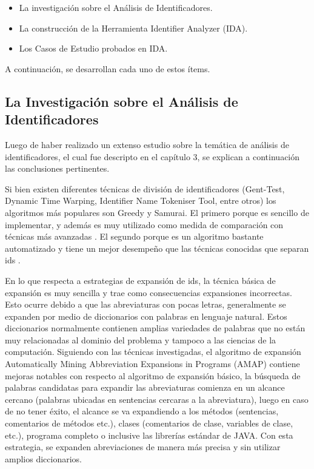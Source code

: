 \begin{itemize}

\item La investigación sobre el Análisis de Identificadores.

\item La construcción de la Herramienta Identifier Analyzer (IDA).

\item Los Casos de Estudio probados en IDA.

\end{itemize}

A continuación, se desarrollan cada uno de estos ítems.

\subsection{La Investigación sobre el Análisis de\\ Identificadores}

Luego de haber realizado un extenso estudio sobre la temática de análisis de identificadores, el cual fue descripto en el capítulo 3, se explican a continuación las conclusiones pertinentes.

Si bien existen diferentes técnicas de división de identificadores (Gent-Test, Dynamic Time Warping,  Identifier Name Tokeniser Tool, entre otros) los algoritmos más populares son Greedy y Samurai. El primero porque es sencillo de implementar, y además es muy utilizado como medida de comparación con técnicas más avanzadas \cite{DLFB06,FBL06,HDD06}. El segundo porque es un algoritmo bastante automatizado y tiene un mejor desempeño que las técnicas conocidas que separan ids \cite{EHPV09}.

En lo que respecta a estrategias de expansión de ids, la técnica básica de expansión es muy sencilla y trae como consecuencias expansiones incorrectas. Esto ocurre debido a que las abreviaturas con pocas letras, generalmente se expanden por medio de diccionarios con palabras en lenguaje natural. Estos diccionarios normalmente contienen amplias variedades de palabras que no están muy relacionadas al dominio del problema y tampoco a las ciencias de la computación.
Siguiendo con las técnicas investigadas, el algoritmo de expansión Automatically Mining Abbreviation Expansions in Programs (AMAP) \cite{EZH08} contiene mejoras notables con respecto al algoritmo de expansión básico, la búsqueda de palabras candidatas para expandir las abreviaturas comienza en un alcance cercano (palabras ubicadas en sentencias cercaras a la abreviatura), luego en caso de no tener éxito, el alcance se va expandiendo a los métodos (sentencias, comentarios de métodos etc.), clases (comentarios de clase, variables de clase, etc.), programa completo o inclusive las librerías estándar de JAVA. Con esta estrategia, se expanden abreviaciones de manera más precisa y sin utilizar amplios diccionarios.

